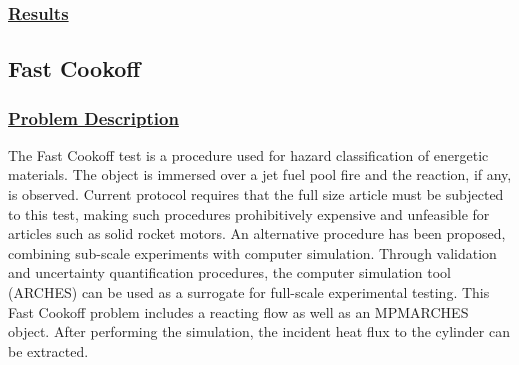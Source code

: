 \subsubsection*{\underline{Results}}


\newpage
\subsection*{\center Fast Cookoff}
\subsubsection*{\underline{Problem Description}}
The Fast Cookoff test is a procedure used for hazard classification of energetic materials.  The object is immersed over a jet fuel pool fire and the reaction, if any, is observed.  Current protocol requires that the full size article must be subjected to this test, making such procedures prohibitively expensive and unfeasible for articles such as solid rocket motors.  An alternative procedure has been proposed, combining sub-scale experiments with computer simulation.  Through validation and uncertainty quantification procedures, the computer simulation tool (ARCHES) can be used as a surrogate for full-scale experimental testing.  This Fast Cookoff problem includes a reacting flow as well as an MPMARCHES object.  After performing the simulation, the incident heat flux to the cylinder can be extracted.  

